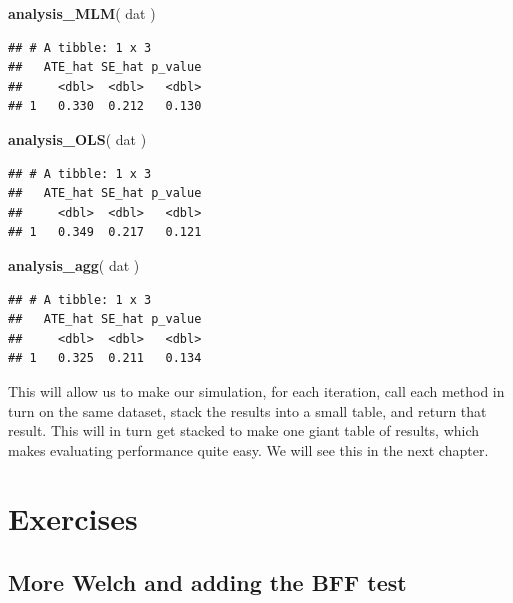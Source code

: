 \documentclass[
]{book}
\newenvironment{Shaded}{\begin{snugshade}}{\end{snugshade}}
\newcommand{\FunctionTok}[1]{\textcolor[rgb]{0.13,0.29,0.53}{\textbf{#1}}}
\newcommand{\NormalTok}[1]{#1}
\begin{document}
\begin{Shaded}
\begin{Highlighting}[]
\FunctionTok{analysis\_MLM}\NormalTok{( dat )}
\end{Highlighting}
\end{Shaded}

\begin{verbatim}
## # A tibble: 1 x 3
##   ATE_hat SE_hat p_value
##     <dbl>  <dbl>   <dbl>
## 1   0.330  0.212   0.130
\end{verbatim}

\begin{Shaded}
\begin{Highlighting}[]
\FunctionTok{analysis\_OLS}\NormalTok{( dat )}
\end{Highlighting}
\end{Shaded}

\begin{verbatim}
## # A tibble: 1 x 3
##   ATE_hat SE_hat p_value
##     <dbl>  <dbl>   <dbl>
## 1   0.349  0.217   0.121
\end{verbatim}

\begin{Shaded}
\begin{Highlighting}[]
\FunctionTok{analysis\_agg}\NormalTok{( dat )}
\end{Highlighting}
\end{Shaded}

\begin{verbatim}
## # A tibble: 1 x 3
##   ATE_hat SE_hat p_value
##     <dbl>  <dbl>   <dbl>
## 1   0.325  0.211   0.134
\end{verbatim}

This will allow us to make our simulation, for each iteration, call each method in turn on the same dataset, stack the results into a small table, and return that result.
This will in turn get stacked to make one giant table of results, which makes evaluating performance quite easy.
We will see this in the next chapter.

\section{Exercises}\label{exercises-3}

\subsection{More Welch and adding the BFF test}\label{more-welch-and-adding-the-bff-test}
\end{document}
